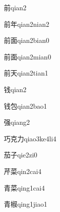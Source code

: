 \begin{verbete}[9]{前}{qian2}
\end{verbete}

\begin{verbete}[9;6]{前年}{qian2nian2}
\end{verbete}

\begin{verbete}[9;9]{前面}{qian2bian0}
\end{verbete}

\begin{verbete}[9;9]{前面}{qian2mian0}
\end{verbete}

\begin{verbete}[9;4]{前天}{qian2tian1}
\end{verbete}

\begin{verbete}[10]{钱}{qian2}
\end{verbete}

\begin{verbete}[10;5]{钱包}{qian2bao1}
\end{verbete}

\begin{verbete}[12]{强}{qiang2}
\end{verbete}

\begin{verbete}[5;7;2]{巧克力}{qiao3ke4li4}
\end{verbete}

\begin{verbete}[8;3]{茄子}{qie2zi0}
\end{verbete}

\begin{verbete}[7;12]{芹菜}{qin2cai4}
\end{verbete}

\begin{verbete}[8;11]{青菜}{qing1cai4}
\end{verbete}

\begin{verbete}[8;12]{青椒}{qing1jiao1}
\end{verbete}

